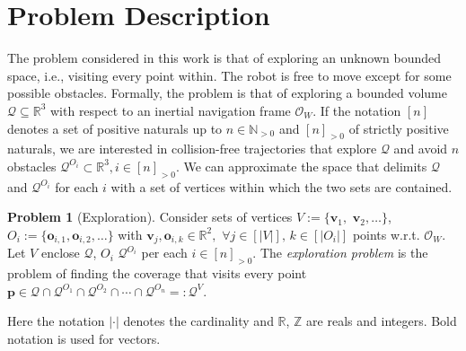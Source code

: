 \documentclass[letterpaper,10pt,conference,twoside]{IEEEtran}
\theoremstyle{definition}
\newtheorem*{pb}{Problem}%
\begin{document}


\section{Problem Description}
\label{sec:pf}
\noindent
The problem considered in this work %
is that of exploring an unknown bounded space, i.e., visiting %
every point %
within.
The robot is free to move except for %
some possible obstacles.
Formally, the problem 
is that of exploring a bounded volume $\mathcal{Q}\subseteq\mathbb{R}^3$ with respect to an inertial navigation frame $\mathcal{O}_W$. If the notation $[n]$ denotes a set of positive naturals up to $n\in\mathbb{N}_{>0}$ and $[n]_{>0}$ of strictly positive naturals, we are interested in collision-free trajectories that explore $\mathcal{Q}$ and avoid $n$ obstacles $\mathcal{Q}^{O_i}\subset\mathbb{R}^3,i\in[n]_{>0}$. We can approximate the space that delimits $\mathcal{Q}$ and $\mathcal{Q}^{O_i}$ for each $i$ with a set of vertices within which the two sets are contained.

\begin{pb}[Exploration]
  Consider sets of vertices $V:=\{\mathbf{v}_1,$ $\mathbf{v}_2,\dots\}$, $O_i:=\{\mathbf{o}_{i,1},\mathbf{o}_{i,2},\dots\}$ with $\mathbf{v}_j,\mathbf{o}_{i,k}\in\mathbb{R}^2,$ $\forall j\in[|V|],\,k\in[|O_i|]$ points w.r.t. $\mathcal{O}_W$. Let $V$ enclose $\mathcal{Q}$, $O_i$ $\mathcal{Q}^{O_i}$ per each $i\in[n]_{>0}$. The \textit{exploration problem} is the problem of finding the coverage that visits %
  every point $\mathbf{p}\in\mathcal{Q}\cap\mathcal{Q}^{O_1}\cap\mathcal{Q}^{O_2}\cap\cdots\cap\mathcal{Q}^{O_n}=:\mathcal{Q}^V$.
\end{pb}

Here the notation $|\cdot|$ denotes the cardinality and $\mathbb{R}$, $\mathbb{Z}$ are reals and integers. Bold notation is used for vectors.
\end{document}
